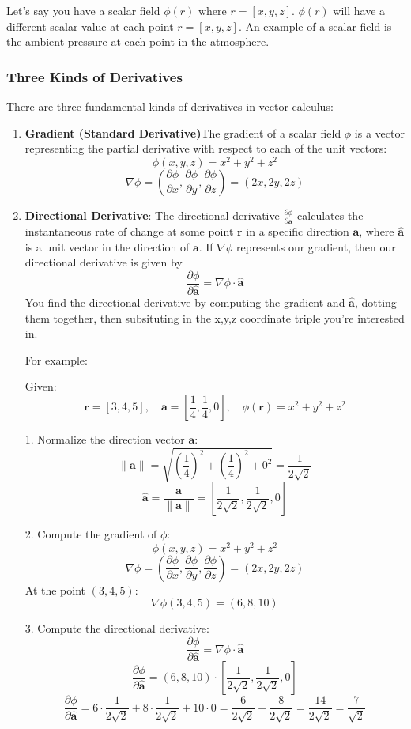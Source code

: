 \documentclass[12pt]{article}
\begin{document}
Let's say you have a scalar field \(\phi(r)\) where \(r = [x, y, z]\). \(\phi(r)\) will have a different scalar value at each point \(r = [x, y, z]\). An example of a scalar field is the ambient pressure at each point in the atmosphere. 
\\
\subsubsection{Three Kinds of Derivatives}
There are three fundamental kinds of derivatives in vector calculus: 

\begin{enumerate}
\item \textbf{Gradient (Standard Derivative)}The gradient of a scalar field \(\phi\) is a vector representing the partial derivative with respect to each of the unit vectors: 
\[
\phi(x, y, z) = x^2 + y^2 + z^2
\]
\[
\nabla \phi = \left( \frac{\partial \phi}{\partial x}, \frac{\partial \phi}{\partial y}, \frac{\partial \phi}{\partial z} \right) = (2x, 2y, 2z)
\]
\item \textbf{Directional Derivative}: The directional derivative \(\frac{\partial \phi}{\partial \mathbf{a}}\) calculates the instantaneous rate of change at some point \(\mathbf{r}\) in a specific direction \(\mathbf{a}\), where \(\mathbf{\hat{a}}\) is a unit vector in the direction of \(\mathbf{a}\). If \(\nabla \phi\) represents our gradient, then our directional derivative is given by
\[\frac{\partial \phi}{\partial \mathbf{\hat{a}}} = \nabla \phi \cdot \mathbf{\hat{a}}\]
You find the directional derivative by computing the gradient and \(\mathbf{\hat{a}}\), dotting them together, then subsituting in the x,y,z coordinate triple you're interested in. 

For example:

Given:
\[
\mathbf{r} = [3,4,5], \quad \mathbf{a} = \left[\frac{1}{4}, \frac{1}{4}, 0\right], \quad \phi(\mathbf{r}) = x^2 + y^2 + z^2
\]

1. Normalize the direction vector \(\mathbf{a}\):
\[
\|\mathbf{a}\| = \sqrt{\left(\frac{1}{4}\right)^2 + \left(\frac{1}{4}\right)^2 + 0^2} = \frac{1}{2\sqrt{2}}
\]
\[
\mathbf{\hat{a}} = \frac{\mathbf{a}}{\|\mathbf{a}\|} = \left[ \frac{1}{2\sqrt{2}}, \frac{1}{2\sqrt{2}}, 0 \right]
\]

2. Compute the gradient of \(\phi\):
\[
\phi(x, y, z) = x^2 + y^2 + z^2
\]
\[
\nabla \phi = \left( \frac{\partial \phi}{\partial x}, \frac{\partial \phi}{\partial y}, \frac{\partial \phi}{\partial z} \right) = (2x, 2y, 2z)
\]
At the point \((3, 4, 5)\):
\[
\nabla \phi (3, 4, 5) = (6, 8, 10)
\]

3. Compute the directional derivative:
\[
\frac{\partial \phi}{\partial \mathbf{\hat{a}}} = \nabla \phi \cdot \mathbf{\hat{a}}
\]
\[
\frac{\partial \phi}{\partial \mathbf{\hat{a}}} = (6, 8, 10) \cdot \left[ \frac{1}{2\sqrt{2}}, \frac{1}{2\sqrt{2}}, 0 \right]
\]
\[
\frac{\partial \phi}{\partial \mathbf{\hat{a}}} = 6 \cdot \frac{1}{2\sqrt{2}} + 8 \cdot \frac{1}{2\sqrt{2}} + 10 \cdot 0 = \frac{6}{2\sqrt{2}} + \frac{8}{2\sqrt{2}} = \frac{14}{2\sqrt{2}} = \frac{7}{\sqrt{2}}
\]

\end{enumerate}
\end{document}
